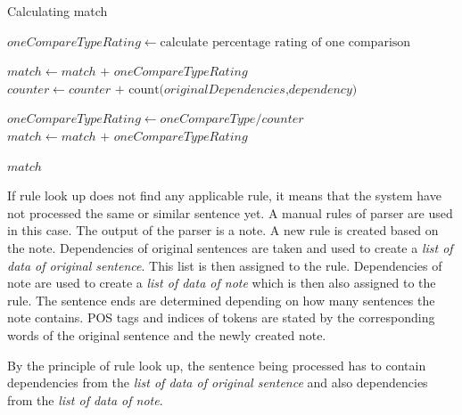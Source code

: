 \documentclass{iitsrc}
\begin{document}
		\begin{algorithm}
			\caption{Calculating match}\label{alg:calculating_match}
			\begin{algorithmic}[1]
				\State $oneCompareTypeRating \gets \text{calculate percentage rating of one comparison}$
				
						\State $match \gets match \text{ + } oneCompareTypeRating$
					\EndIf
					\State $counter \gets counter \text{ + } \text{count(}originalDependencies\text{,} dependency\text{)}$
				\EndFor
				
				\State $oneCompareTypeRating \gets oneCompareType / counter$
								\State $match \gets match \text{ + } oneCompareTypeRating$
							\EndIf
						\EndFor
					\EndFor
				\EndFor
				
				\Return $match$
				\EndProcedure
			\end{algorithmic}
		\end{algorithm}
	
		If rule look up does not find any applicable rule, it means that the system have not processed the same or similar sentence yet. A manual rules of parser are used in this case. The output of the parser is a note. A new rule is created based on the note. Dependencies of original sentences are taken and used to create a \textit{list of data of original sentence}. This list is then assigned to the rule. Dependencies of note are used to create a \textit{list of data of note} which is then also assigned to the rule. The sentence ends are determined depending on how many sentences the note contains. POS tags and indices of tokens are stated by the corresponding words of the original sentence and the newly created note.
		
		By the principle of rule look up, the sentence being processed has to contain dependencies from the \textit{list of data of original sentence} and also dependencies from the \textit{list of data of note}.
	
\end{document}
